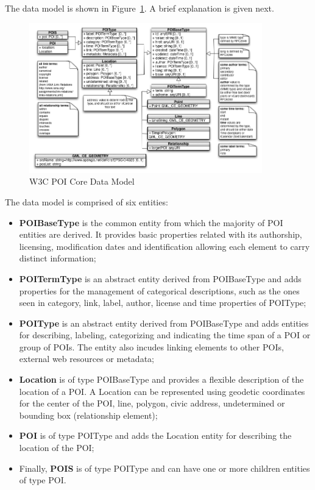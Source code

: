 \documentclass[times]{ettauth}
\begin{document}
The data model is shown in Figure~\ref{fig:data-model}. A brief explanation is given next.

\begin{figure}[!ht]
\centering
\includegraphics[width=0.9\textwidth]{images/uml}
\caption{W3C POI Core Data Model}
\label{fig:data-model}
\end{figure}

The data model is comprised of six entities:
\begin{itemize}
\item \textbf{POIBaseType} is the common entity from which the majority of POI entities are derived. It provides basic properties related with its authorship, licensing, modification dates and identification allowing each element to carry distinct information;
\item \textbf{POITermType} is an abstract entity derived from POIBaseType and adds properties for the management of categorical descriptions, such as the ones seen in category, link, label, author, license and time properties of POIType;
\item \textbf{POIType} is an abstract entity derived from POIBaseType and adds entities for describing, labeling, categorizing and indicating the time span of a POI or group of POIs. The entity also incudes linking elements to other POIs, external web resources or metadata;
\item \textbf{Location} is of type POIBaseType and provides a flexible description of the location of a POI. A Location can be represented using geodetic coordinates for the center of the POI, line, polygon, civic address,  undetermined or bounding box (relationship element);
\item \textbf{POI} is of type POIType and adds the Location entity for describing the location of the POI;
\item Finally, \textbf{POIS} is of type POIType and can have one or more children entities of type POI.
\end{itemize}
\end{document}
